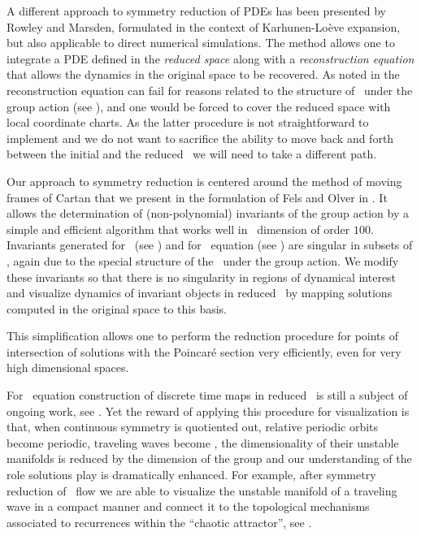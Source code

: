 A different approach to symmetry reduction of PDEs has been
presented by Rowley and
Marsden, formulated in the
context of {Karhunen-Lo\`{e}ve} expansion, but also applicable
to direct numerical simulations.
The method allows one to integrate a PDE defined in the
\emph{reduced space} along with a \emph{reconstruction
equation} that allows the dynamics in the original space to
be recovered. As noted in
 the reconstruction
equation can fail for reasons related to the structure of
\statesp\ under the group action (see ),
and one would be forced to cover the reduced space with local
coordinate charts. As the latter procedure is not
straightforward to implement and we do not want to sacrifice
the ability to move back and forth between the initial and
the reduced \statesp\ we will need to take a different path.

Our approach to symmetry reduction is centered around the
method of moving frames of Cartan that we
present in the formulation of Fels and Olver
in . It allows the determination of
(non-polynomial) invariants of the group action by a simple
and efficient algorithm that works well in \statesp\
dimension of order $100$. Invariants generated for \CLe\ (see
) and for \KS\ equation (see
) are singular in subsets of \statesp,
again due to the special structure of the \statesp\ under the
group action. We modify these invariants so that there is no
singularity in regions of dynamical interest and visualize
dynamics of invariant objects in reduced \statesp\ by mapping
solutions computed in the original space to this basis.

This simplification allows one to perform the reduction
procedure for points of intersection of solutions with the
Poincar\'e section very efficiently, even for very high
dimensional spaces.

For \KS\ equation construction of discrete time maps in
reduced \statesp\ is still a subject of ongoing work, see
. Yet the reward of applying this
procedure for visualization is that, when continuous symmetry
is quotiented out, relative periodic orbits become periodic,
traveling waves become \eqva, the dimensionality of their
unstable manifolds is reduced by the dimension of the group
and our understanding of the role solutions play is
dramatically enhanced.
For example, after symmetry reduction of
\KS\ flow we are able to visualize the unstable manifold of a
traveling wave in a compact manner and connect it to the
topological mechanisms associated to recurrences within the
``chaotic attractor'', see .

